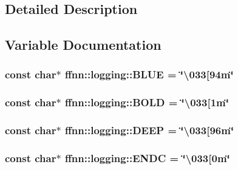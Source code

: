 \subsection{Detailed Description}


\subsection{Variable Documentation}
\hypertarget{group___unicode_color_definitions_ga3e2c8118c023bd9d8bb394366f943cc5}{
\subsubsection[{B\-L\-U\-E}]{\setlength{\rightskip}{0pt plus 5cm}const char$\ast$ ffnn\-::logging\-::\-B\-L\-U\-E = \char`\"{}\textbackslash{}033\mbox{[}94m\char`\"{}}}\label{group___unicode_color_definitions_ga3e2c8118c023bd9d8bb394366f943cc5}
\hypertarget{group___unicode_color_definitions_ga32fca3fc24af93ce9c4ca33b4a6a3dde}{
\subsubsection[{B\-O\-L\-D}]{\setlength{\rightskip}{0pt plus 5cm}const char$\ast$ ffnn\-::logging\-::\-B\-O\-L\-D = \char`\"{}\textbackslash{}033\mbox{[}1m\char`\"{}}}\label{group___unicode_color_definitions_ga32fca3fc24af93ce9c4ca33b4a6a3dde}
\hypertarget{group___unicode_color_definitions_gaf7e0109fd04ef8852f6e1fa5c96057e1}{
\subsubsection[{D\-E\-E\-P}]{\setlength{\rightskip}{0pt plus 5cm}const char$\ast$ ffnn\-::logging\-::\-D\-E\-E\-P = \char`\"{}\textbackslash{}033\mbox{[}96m\char`\"{}}}\label{group___unicode_color_definitions_gaf7e0109fd04ef8852f6e1fa5c96057e1}
\hypertarget{group___unicode_color_definitions_gab21e47dcbc216f8fc7de88bd217f9f0a}{
\subsubsection[{E\-N\-D\-C}]{\setlength{\rightskip}{0pt plus 5cm}const char$\ast$ ffnn\-::logging\-::\-E\-N\-D\-C = \char`\"{}\textbackslash{}033\mbox{[}0m\char`\"{}}}\label{group___unicode_color_definitions_gab21e47dcbc216f8fc7de88bd217f9f0a}
